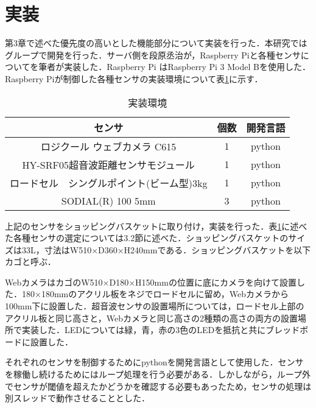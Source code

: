 

\section{実装}

第3章で述べた優先度の高いとした機能部分について実装を行った．本研究ではグループで開発を行った．サーバ側を段原丞治が，Raspberry Piと各種センサについてを筆者が実装した．Raspberry Pi はRaspberry Pi 3 Model Bを使用した．Raspberry Piが制御した各種センサの実装環境について表\ref{jissou}に示す．


\begin{table}[htb]
\begin{center}
\caption{実装環境}
\begin{tabular}{|c|c|c|} \hline
センサ & 個数 & 開発言語 \\ \hline \hline
ロジクール ウェブカメラ C615 & 1 & python \\
HY-SRF05超音波距離センサモジュール & 1 & python \\
ロードセル　シングルポイント(ビーム型)3kg & 1 & python \\
SODIAL(R) 100 5mm & 3 & python \\ \hline
\end{tabular}
\label{jissou}
\end{center}
\end{table}


上記のセンサをショッピングバスケットに取り付け，実装を行った．表\ref{jissou}に述べた各種センサの選定については3.2節に述べた．ショッピングバスケットのサイズは33L，寸法はW510×D360×H240mmである．ショッピングバスケットを以下カゴと呼ぶ．

WebカメラはカゴのW510×D180×H150mmの位置に底にカメラを向けて設置した．180×180mmのアクリル板をネジでロードセルに留め，Webカメラから100mm下に設置した．超音波センサの設置場所については，ロードセル上部のアクリル板と同じ高さと，Webカメラと同じ高さの2種類の高さの両方の設置場所で実装した．LEDについては緑，青，赤の3色のLEDを抵抗と共にブレッドボードに設置した．

それぞれのセンサを制御するためにpythonを開発言語として使用した．センサを稼働し続けるためにはループ処理を行う必要がある．しかしながら，ループ外でセンサが閾値を超えたかどうかを確認する必要もあったため，センサの処理は別スレッドで動作させることとした．

